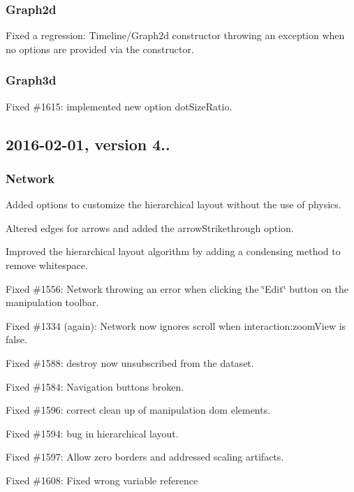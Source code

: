 \subsubsection*{Graph2d}


\begin{DoxyItemize}
\item Fixed a regression\+: Timeline/\+Graph2d constructor throwing an exception when no options are provided via the constructor.
\end{DoxyItemize}

\subsubsection*{Graph3d}


\begin{DoxyItemize}
\item Fixed \#1615\+: implemented new option {\ttfamily dot\+Size\+Ratio}.
\end{DoxyItemize}

\subsection*{2016-\/02-\/01, version 4..}

\subsubsection*{Network}


\begin{DoxyItemize}
\item Added options to customize the hierarchical layout without the use of physics.
\item Altered edges for arrows and added the arrow\+Strikethrough option.
\item Improved the hierarchical layout algorithm by adding a condensing method to remove whitespace.
\item Fixed \#1556\+: Network throwing an error when clicking the \char`\"{}\+Edit\char`\"{} button on the manipulation toolbar.
\item Fixed \#1334 (again)\+: Network now ignores scroll when interaction\+:zoom\+View is false.
\item Fixed \#1588\+: destroy now unsubscribed from the dataset.
\item Fixed \#1584\+: Navigation buttons broken.
\item Fixed \#1596\+: correct clean up of manipulation dom elements.
\item Fixed \#1594\+: bug in hierarchical layout.
\item Fixed \#1597\+: Allow zero borders and addressed scaling artifacts.
\item Fixed \#1608\+: Fixed wrong variable reference
\end{DoxyItemize}

